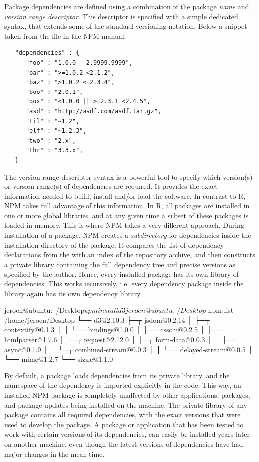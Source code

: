 Package dependencies are defined using a combination of the package \emph{name}
and \emph{version range descriptor}. This descriptor is specified with a
simple dedicated syntax, that extends some of the standard versioning notation.
Below a snippet taken from the  file in the NPM manual:

\footnotesize
\begin{verbatim}
   "dependencies" : {
      "foo" : "1.0.0 - 2.9999.9999",
      "bar" : ">=1.0.2 <2.1.2",
      "baz" : ">1.0.2 <=2.3.4",
      "boo" : "2.0.1",
      "qux" : "<1.0.0 || >=2.3.1 <2.4.5",
      "asd" : "http://asdf.com/asdf.tar.gz",
      "til" : "~1.2",
      "elf" : "~1.2.3",
      "two" : "2.x",
      "thr" : "3.3.x",
   }
\end{verbatim}

\noindent The version range descriptor syntax is a powerful tool to specify
which version(s) or version range(s) of dependencies are required. It provides the exact
information needed to build, install and/or load the software. In contrast to R,
NPM takes full advantage of this information. In R, all packages are installed
in one or more global libraries, and at any given time a subset of these packages
is loaded in memory. This is where NPM takes a very different approach. During
installation of a package, NPM creates a \emph{subdirectory} for dependencies inside
the installation directory of the package. It compares the list of dependency
declarations from the  with an index of the repository archive,
and then constructs a private library containing the full dependency tree and precise
versions as specified by the author. Hence, every installed package has its own library
of dependencies. This works recursively, i.e. every dependency package inside
the library again has its own dependency library.

\begin{codeblock}
jeroen@ubuntu:~/Desktop$ npm install d3
jeroen@ubuntu:~/Desktop$ npm list
/home/jeroen/Desktop
└─┬ d3@2.10.3
  ├─┬ jsdom@0.2.14
  │ ├─┬ contextify@0.1.3
  │ │ └── bindings@1.0.0
  │ ├── cssom@0.2.5
  │ ├── htmlparser@1.7.6
  │ └─┬ request@2.12.0
  │   ├─┬ form-data@0.0.3
  │   │ ├── async@0.1.9
  │   │ └─┬ combined-stream@0.0.3
  │   │   └── delayed-stream@0.0.5
  │   └── mime@1.2.7
  └── sizzle@1.1.0
\end{codeblock}

\noindent By default, a package loads dependencies from its private library, and
the namespace of the dependency is imported explicitly in the code. This way, an
installed NPM package is completely unaffected by other applications, packages,
and package updates being installed on the machine. The private library of any
package contains all required dependencies, with the exact versions that
were used to develop the package. A package or application that has been
tested to work with certain versions of its dependencies, can easily be
installed years later on another machine, even though the latest versions of
dependencies have had major changes in the mean time.

